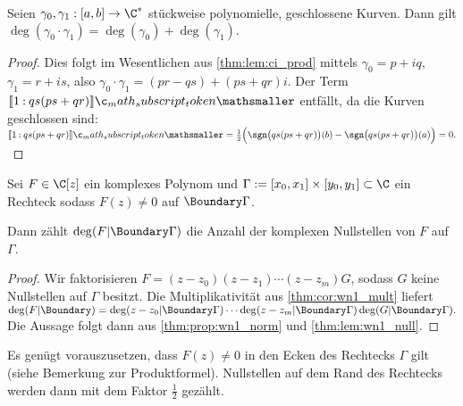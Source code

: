 \documentclass{mythesis}
\begin{document}
\begin{corollary}[Multiplikativität] \label{thm:cor:wn1_mult}
    Seien $\gamma_0, \gamma_1: [a,b] \to \C^*$ stückweise polynomielle, geschlossene Kurven.
    Dann gilt
    \begin{math}
        \deg(\gamma_0 \cdot \gamma_1) = \deg(\gamma_0) + \deg(\gamma_1).
    \end{math}
    \begin{proof}
        Dies folgt im Wesentlichen aus \ref{thm:lem:ci_prod} mittels $\gamma_0 = p + iq$, $\gamma_1 = r + is$, also $\gamma_0\cdot\gamma_1 = (pr-qs) + (ps +qr)i$.
        Der Term $\Index{}{1}{qs(ps+qr)}$ entfällt, da die Kurven geschlossen sind:
        \begin{math}
            \Index{}{1}{qs(ps+qr)}
            = \frac{1}{2}\Big(\sgn\big(qs(ps+qr)\big)(b) - \sgn\big(qs(ps+qr)\big)(a)\Big)
            = 0.
        \end{math}
    \end{proof}
\end{corollary}

\begin{corollary}
    Sei $F \in \C[z]$ ein komplexes Polynom und $\Gamma := [x_0,x_1] \times [y_0, y_1] \subset \C$ ein Rechteck sodass $F(z) \neq 0$ auf $\Boundary\Gamma$.

    Dann zählt $\deg(F|\Boundary\Gamma)$ die Anzahl der komplexen Nullstellen von $F$ auf $\Gamma$.
    \begin{proof}
        Wir faktorisieren $F = (z-z_0)(z-z_1) \dotsb(z-z_m) G$, sodass $G$ keine Nullstellen auf $\Gamma$ besitzt.
        Die Multiplikativität aus \ref{thm:cor:wn1_mult} liefert
        \begin{math}
            \deg(F|\Boundary) = \deg(z-z_0|\Boundary\Gamma) \dotsb \deg(z-z_m|\Boundary\Gamma) \deg(G|\Boundary\Gamma).
        \end{math}
        Die Aussage folgt dann aus \ref{thm:prop:wn1_norm} und \ref{thm:lem:wn1_null}.
    \end{proof}
    \begin{note}
        Es genügt vorauszusetzen, dass $F(z) \neq 0$ in den Ecken des Rechtecks $\Gamma$ gilt (siehe Bemerkung zur Produktformel).
        Nullstellen auf dem Rand des Rechtecks werden dann mit dem Faktor $\frac{1}{2}$ gezählt.
    \end{note}
\end{corollary}
\end{document}
